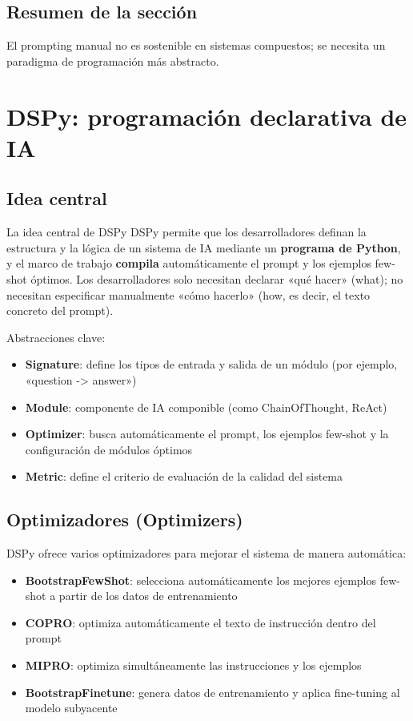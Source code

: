 \documentclass[a4paper]{article}
\begin{document}
\subsection{Resumen de la sección}

El prompting manual no es sostenible en sistemas compuestos; se necesita un paradigma de programación más abstracto.

\section{DSPy: programación declarativa de IA}

\subsection{Idea central}

\begin{importantbox}{La idea central de DSPy}
DSPy permite que los desarrolladores definan la estructura y la lógica de un sistema de IA mediante un \textbf{programa de Python}, y el marco de trabajo \textbf{compila} automáticamente el prompt y los ejemplos few-shot óptimos. Los desarrolladores solo necesitan declarar «qué hacer» (what); no necesitan especificar manualmente «cómo hacerlo» (how, es decir, el texto concreto del prompt).
\end{importantbox}

Abstracciones clave:
\begin{itemize}
    \item \textbf{Signature}: define los tipos de entrada y salida de un módulo (por ejemplo, «question -> answer»)
    \item \textbf{Module}: componente de IA componible (como ChainOfThought, ReAct)
    \item \textbf{Optimizer}: busca automáticamente el prompt, los ejemplos few-shot y la configuración de módulos óptimos
    \item \textbf{Metric}: define el criterio de evaluación de la calidad del sistema
\end{itemize}

\subsection{Optimizadores (Optimizers)}

DSPy ofrece varios optimizadores para mejorar el sistema de manera automática:

\begin{itemize}
    \item \textbf{BootstrapFewShot}: selecciona automáticamente los mejores ejemplos few-shot a partir de los datos de entrenamiento
    \item \textbf{COPRO}: optimiza automáticamente el texto de instrucción dentro del prompt
    \item \textbf{MIPRO}: optimiza simultáneamente las instrucciones y los ejemplos
    \item \textbf{BootstrapFinetune}: genera datos de entrenamiento y aplica fine-tuning al modelo subyacente
\end{itemize}
\end{document}

